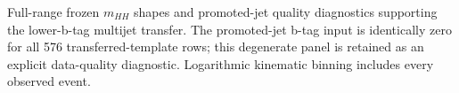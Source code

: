 Full-range frozen $m_{HH}$ shapes and promoted-jet quality diagnostics supporting the lower-b-tag multijet transfer. The promoted-jet b-tag input is identically zero for all 576 transferred-template rows; this degenerate panel is retained as an explicit data-quality diagnostic. Logarithmic kinematic binning includes every observed event.
